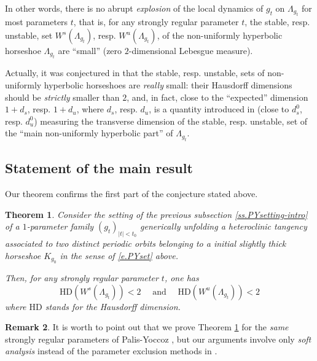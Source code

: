 \documentclass[12pt]{amsart}
\newtheorem{theorem}{Theorem}[section]
\numberwithin{equation}{section}
\theoremstyle{definition}
\newtheorem{remark}[theorem]{Remark}
\newcommand{\<}{{\langle}}
\renewcommand{\>}{{\rangle}}
\begin{document}
In other words, there is no abrupt \emph{explosion} of the local dynamics of $g_t$ on $\Lambda_{g_t}$ for most parameters $t$, %
that is, for any strongly regular parameter $t$, the stable, resp. unstable, set $W^s(\Lambda_{g_t})$, resp. $W^u(\Lambda_{g_t})$, of the non-uniformly hyperbolic horseshoe $\Lambda_{g_t}$ are ``small'' (zero $2$-dimensional Lebesgue measure). 

Actually, it was conjectured in \cite[p. 14]{PY09} that the stable, resp. unstable, sets of non-uniformly hyperbolic horseshoes are \emph{really} small: their Hausdorff dimensions should be \emph{strictly} smaller than $2$, and, in fact, %
close 
to the ``expected'' dimension $1+d_s$, resp. $1+d_u$, where $d_s$, resp. $d_u$, is a %
quantity introduced in \cite{PY09} (close to $d_s^0$, resp. $d_u^0$) measuring the transverse dimension of the stable, resp. unstable, set of the ``main non-uniformly hyperbolic part'' of 
$\Lambda_{g_t}$.

\subsection{Statement of the main result} Our theorem confirms the first part of the conjecture stated above.

\begin{theorem}\label{t.MPY-A} Consider the setting of the previous subsection \ref{ss.PYsetting-intro} of a $1$-parameter family $(g_t)_{|t|<t_0}$ generically unfolding a heteroclinic tangency associated to two distinct periodic orbits belonging to a initial slightly thick horseshoe $K_{g_0}$ in the sense of \eqref{e.PYset} above. 

Then, for any strongly regular parameter $t$, one has 
$$\textrm{HD}(W^s(\Lambda_{g_t}))<2 \quad \textrm{ and } \quad \textrm{HD}(W^u(\Lambda_{g_t}))<2$$
where $\textrm{HD}$ stands for the Hausdorff dimension.
\end{theorem}

\begin{remark} It is worth to point out that we prove Theorem \ref{t.MPY-A} for the \emph{same} strongly regular parameters of Palis-Yoccoz \cite{PY09}, but our arguments involve only \emph{soft analysis} instead of the parameter exclusion methods in \cite{PY09}. 
\end{remark}
\end{document}
